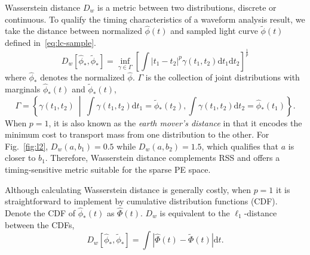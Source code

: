 Wasserstein distance $D_w$ is a metric between two distributions, discrete or continuous. To qualify the timing characteristics of a waveform analysis result, we take the distance between normalized $\hat{\phi}(t)$ and sampled light curve $\tilde{\phi}(t)$ defined in~\eqref{eq:lc-sample}.
\begin{equation}
  D_w\left[\hat{\phi}_*, \tilde{\phi}_*\right] = \inf_{\gamma \in \Gamma} \left[\int \left\vert t_1 - t_2 \right\vert^p \gamma(t_1, t_2)\mathrm{d}t_1\mathrm{d}t_2\right]^{\frac{1}{p}}
\end{equation}
where $\hat{\phi}_*$ denotes the normalized $\hat{\phi}$. $\Gamma$ is the collection of joint distributions with marginals $\hat{\phi}_*(t)$ and $\tilde{\phi}_*(t)$,
\begin{equation*}
  \label{eq:joint}
  \Gamma = \left\{\gamma(t_1, t_2) ~\middle\vert~ \int\gamma(t_1,t_2)\mathrm{d}t_1 = \tilde{\phi}_*(t_2) , \int\gamma(t_1,t_2)\mathrm{d}t_2 = \hat{\phi}_*(t_1)  \right\}.
\end{equation*}
When $p=1$, it is also known as the \textit{earth mover's distance} in that it encodes the minimum cost to transport mass from one distribution to the other.
For Fig.~\ref{fig:l2}, $D_w(a, b_1) = 0.5$ while $D_w(a, b_2) = 1.5$, which qualifies that $a$ is closer to $b_1$.  Therefore, Wasserstein distance complements RSS and offers a timing-sensitive metric suitable for the sparse PE space.

Although calculating Wasserstein distance is generally costly, when $p=1$ it is straightforward to implement by cumulative distribution functions (CDF).  Denote the CDF of $\hat{\phi}_*(t)$ as $\hat\Phi(t)$.  $D_w$ is equivalent to the $\ell_1$-distance between the CDFs,
\begin{equation}
    D_w\left[\hat{\phi}_*, \tilde{\phi}_*\right] = \int\left|\hat{\Phi}(t) - \tilde{\Phi}(t)\right| \mathrm{d}t.
    \label{eq:numerical}
\end{equation}
